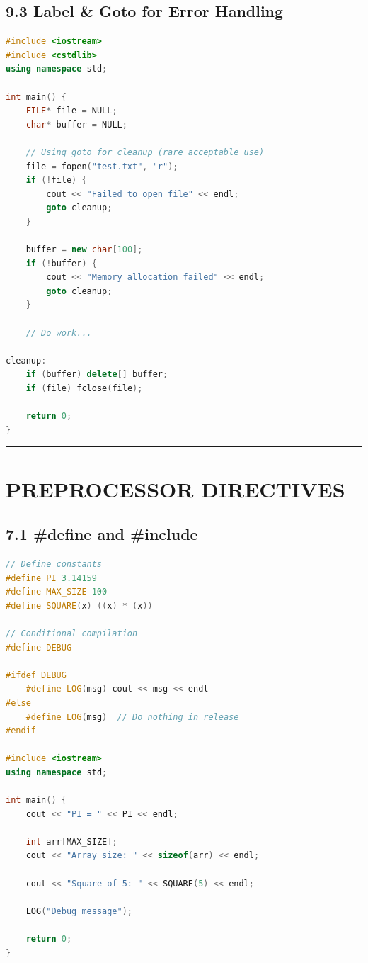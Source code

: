 \hypertarget{label-goto-for-error-handling}{%
\subsection{9.3 Label \& Goto for Error
Handling}\label{label-goto-for-error-handling}}

\begin{lstlisting}[language={C++}]
#include <iostream>
#include <cstdlib>
using namespace std;

int main() {
    FILE* file = NULL;
    char* buffer = NULL;

    // Using goto for cleanup (rare acceptable use)
    file = fopen("test.txt", "r");
    if (!file) {
        cout << "Failed to open file" << endl;
        goto cleanup;
    }

    buffer = new char[100];
    if (!buffer) {
        cout << "Memory allocation failed" << endl;
        goto cleanup;
    }

    // Do work...

cleanup:
    if (buffer) delete[] buffer;
    if (file) fclose(file);

    return 0;
}
\end{lstlisting}

\begin{center}\rule{0.5\linewidth}{0.5pt}\end{center}

\hypertarget{preprocessor-directives}{%
\section{PREPROCESSOR DIRECTIVES}\label{preprocessor-directives}}

\hypertarget{define-and-include}{%
\subsection{7.1 \#define and \#include}\label{define-and-include}}

\begin{lstlisting}[language={C++}]
// Define constants
#define PI 3.14159
#define MAX_SIZE 100
#define SQUARE(x) ((x) * (x))

// Conditional compilation
#define DEBUG

#ifdef DEBUG
    #define LOG(msg) cout << msg << endl
#else
    #define LOG(msg)  // Do nothing in release
#endif

#include <iostream>
using namespace std;

int main() {
    cout << "PI = " << PI << endl;

    int arr[MAX_SIZE];
    cout << "Array size: " << sizeof(arr) << endl;

    cout << "Square of 5: " << SQUARE(5) << endl;

    LOG("Debug message");

    return 0;
}
\end{lstlisting}

